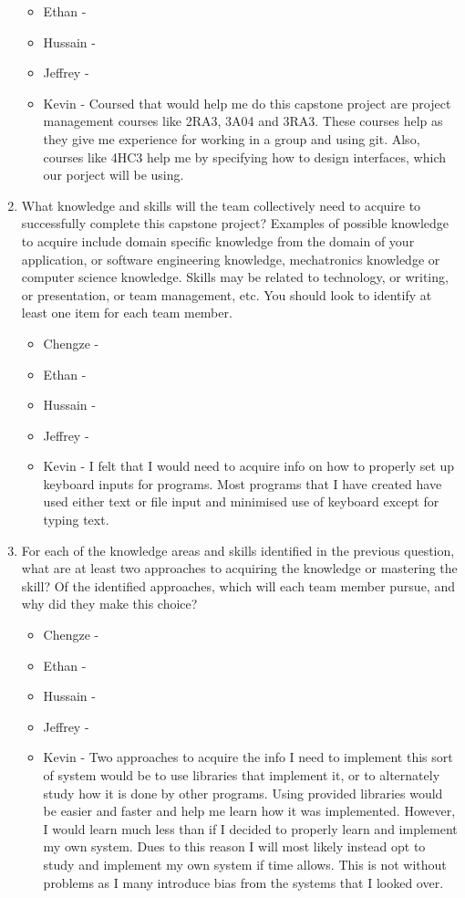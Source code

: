 \begin{enumerate}
\begin{itemize}
        \item Ethan - 
        \item Hussain - 
        \item Jeffrey - 
        \item Kevin - Coursed that would help me do this capstone project are project management courses like 2RA3, 3A04 and 3RA3. These courses help as they give me experience for working in a group and using git. Also, courses like 4HC3 help me by specifying how to design interfaces, which our porject will be using. 
  \end{itemize} 
  \item What knowledge and skills will the team collectively need to acquire to
  successfully complete this capstone project?  Examples of possible knowledge
  to acquire include domain specific knowledge from the domain of your
  application, or software engineering knowledge, mechatronics knowledge or
  computer science knowledge.  Skills may be related to technology, or writing,
  or presentation, or team management, etc.  You should look to identify at
  least one item for each team member.
  \begin{itemize}
        \item Chengze - 
        \item Ethan - 
        \item Hussain - 
        \item Jeffrey - 
        \item Kevin - I felt that I would need to acquire info on how to properly set up keyboard inputs for programs. Most programs that I have created have used either text or file input and minimised use of keyboard except for typing text. 
  \end{itemize} 
  \item For each of the knowledge areas and skills identified in the previous
  question, what are at least two approaches to acquiring the knowledge or
  mastering the skill?  Of the identified approaches, which will each team
  member pursue, and why did they make this choice?
  \begin{itemize}
        \item Chengze - 
        \item Ethan - 
        \item Hussain - 
        \item Jeffrey - 
        \item Kevin - Two approaches to acquire the info I need to implement this sort of system would be to use libraries that implement it, or to alternately study how it is done by other programs. Using provided libraries would be easier and faster and help me learn how it was implemented. However, I would learn much less than if I decided to properly learn and implement my own system. Dues to this reason I will most likely instead opt to study and implement my own system  if time allows. This is not without problems as I many introduce bias from the systems that I looked over.
  \end{itemize} 
\end{enumerate}
